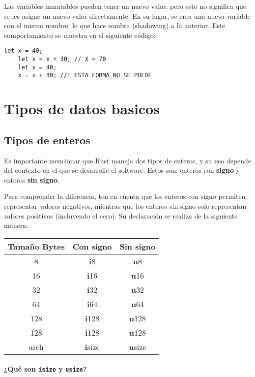 \documentclass[12pt]{article}
\begin{document}
	Las variables inmutables pueden tener un nuevo valor, pero esto no significa que se les asigne un nuevo valor directamente. En su lugar, se crea una nueva variable con el mismo nombre, lo que hace sombra (shadowing) a la anterior. Este comportamiento se muestra en el siguiente código:

\begin{lstlisting}[style=ruststyle]
	let x = 40;
	let x = x + 30; // X = 70
	let x = 40;
	x = x + 30; //! ESTA FORMA NO SE PUEDE
\end{lstlisting}

	\newpage
\section{Tipos de datos basicos}
	\subsection{Tipos de enteros}
Es importante mencionar que Rust maneja dos tipos de enteros, y su uso depende del contexto en el que se desarrolle el software. Estos son: enteros con \textbf{signo} y enteros \textbf{sin signo}.

Para comprender la diferencia, ten en cuenta que los enteros con signo permiten representar valores negativos, mientras que los enteros sin signo solo representan valores positivos (incluyendo el cero). Su declaración se realiza de la siguiente manera:

\begin{table}[H]
	\centering
	\begin{tabular}{|c|c|c|}
		\hline
		Tamaño Bytes & Con signo & Sin signo \\
		\hline
		8 & \textbf{i}8 & \textbf{u}8 \\
		\hline
		16 & \textbf{i}16 & \textbf{u}16 \\
		\hline
		32 & \textbf{i}32 & \textbf{u}32 \\
		\hline
		64 & \textbf{i}64 & \textbf{u}64 \\
		\hline
		128 & \textbf{i}128 & \textbf{u}128 \\
		\hline
		128 & \textbf{i}128 & \textbf{u}128 \\
		\hline
		arch &  \textbf{i}size & \textbf{u}size \\
		\hline
	\end{tabular}
\end{table}

\paragraph{¿Qué son \texttt{isize} y \texttt{usize}?}
\end{document}

